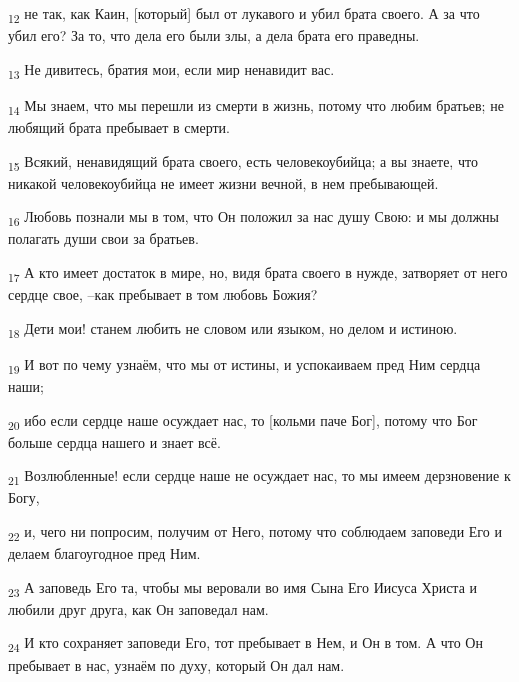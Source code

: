 \begin{tcolorbox}
\textsubscript{12} не так, как Каин, [который] был от лукавого и убил брата своего. А за что убил его? За то, что дела его были злы, а дела брата его праведны.
\end{tcolorbox}
\begin{tcolorbox}
\textsubscript{13} Не дивитесь, братия мои, если мир ненавидит вас.
\end{tcolorbox}
\begin{tcolorbox}
\textsubscript{14} Мы знаем, что мы перешли из смерти в жизнь, потому что любим братьев; не любящий брата пребывает в смерти.
\end{tcolorbox}
\begin{tcolorbox}
\textsubscript{15} Всякий, ненавидящий брата своего, есть человекоубийца; а вы знаете, что никакой человекоубийца не имеет жизни вечной, в нем пребывающей.
\end{tcolorbox}
\begin{tcolorbox}
\textsubscript{16} Любовь познали мы в том, что Он положил за нас душу Свою: и мы должны полагать души свои за братьев.
\end{tcolorbox}
\begin{tcolorbox}
\textsubscript{17} А кто имеет достаток в мире, но, видя брата своего в нужде, затворяет от него сердце свое, --как пребывает в том любовь Божия?
\end{tcolorbox}
\begin{tcolorbox}
\textsubscript{18} Дети мои! станем любить не словом или языком, но делом и истиною.
\end{tcolorbox}
\begin{tcolorbox}
\textsubscript{19} И вот по чему узнаём, что мы от истины, и успокаиваем пред Ним сердца наши;
\end{tcolorbox}
\begin{tcolorbox}
\textsubscript{20} ибо если сердце наше осуждает нас, то [кольми паче Бог], потому что Бог больше сердца нашего и знает всё.
\end{tcolorbox}
\begin{tcolorbox}
\textsubscript{21} Возлюбленные! если сердце наше не осуждает нас, то мы имеем дерзновение к Богу,
\end{tcolorbox}
\begin{tcolorbox}
\textsubscript{22} и, чего ни попросим, получим от Него, потому что соблюдаем заповеди Его и делаем благоугодное пред Ним.
\end{tcolorbox}
\begin{tcolorbox}
\textsubscript{23} А заповедь Его та, чтобы мы веровали во имя Сына Его Иисуса Христа и любили друг друга, как Он заповедал нам.
\end{tcolorbox}
\begin{tcolorbox}
\textsubscript{24} И кто сохраняет заповеди Его, тот пребывает в Нем, и Он в том. А что Он пребывает в нас, узнаём по духу, который Он дал нам.
\end{tcolorbox}
